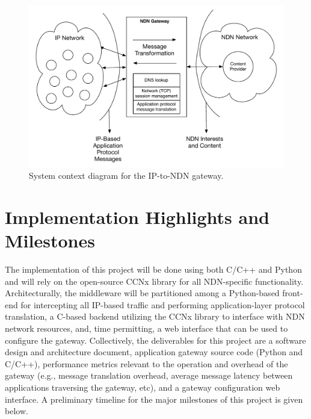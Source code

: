\documentclass[10pt]{article}
\begin{document}
\begin{figure}
\begin{center}
\includegraphics[scale=0.5]{../../sketches/gateway_highlevel.pdf}
\caption{System context diagram for the IP-to-NDN gateway.}
\end{center}
\end{figure}

\section{Implementation Highlights and Milestones}
The implementation of this project will be done using both C/C++ and Python and will rely on the open-source CCNx \cite{ccnx} library for all NDN-specific functionality. Architecturally, the middleware will be partitioned among a Python-based front-end for intercepting all IP-based traffic and performing application-layer protocol translation, a C-based backend utilizing the CCNx library to interface with NDN network resources, and, time permitting, a web interface that can be used to configure the gateway. Collectively, the deliverables for this project are a software design and architecture document, application gateway source code (Python and C/C++), performance metrics relevant to the operation and overhead of the gateway (e.g., message translation overhead, average message latency between applications traversing the gateway, etc), and a gateway configuration web interface. A preliminary timeline for the major milestones of this project is given below.
\end{document}
